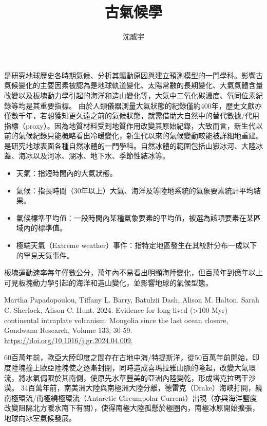\documentclass[a4paper,12pt]{report}
\begin{document}
\title{古氣候學}
\author{沈威宇}
\date{\temtoday}
\titletocdoc
{}
是研究地球歷史各時期氣候、分析其驅動原因與建立預測模型的一門學科。影響古氣候變化的主要因素被認為是地球軌道變化、太陽常數的長期變化、大氣氣體含量改變以及板塊動力學引起的海洋和造山變化等，大氣中二氧化碳濃度、氧同位素紀錄等均是其重要指標。
由於人類儀器測量大氣狀態的紀錄僅約400年，歷史文獻亦僅數千年，若想獲知更久遠之前的氣候狀態，就需借助大自然中的替代數據/代用指標（proxy）。因為地質材料受到地質作用改變其原始紀錄，大致而言，新生代以前的氣候紀錄只能概略看出冷暖變化，新生代以來的氣候變動較能被詳細地重建。
是研究地球表面各種自然冰體的一門學科。自然冰體的範圍包括山嶽冰河、大陸冰蓋、海冰以及河冰、湖冰、地下水、季節性結冰等。
\begin{itemize}
\item 天氣：指短時間內的大氣狀態。
\item 氣候：指長時間（30年以上）大氣、海洋及等陸地系統的氣象要素統計平均結果。
\item 氣候標準平均值：一段時間內某種氣象要素的平均值，被選為該項要素在某區域內的標準值。
\item 極端天氣（Extreme weather）事件：指特定地區發生在其統計分布一成以下的罕見天氣事件。
\end{itemize}
板塊運動速率每年僅數公分，萬年內不易看出明顯海陸變化，但百萬年到億年以上可見板塊動力學引起的海洋和造山變化，並影響地球的氣候型態。
\bct\bfH\ctr{}\caption{Martha Papadopoulou, Tiffany L. Barry, Batulzii Dash, Alison M. Halton, Sarah C. Sherlock, Alison C. Hunt. 2024. Evidence for long-lived (>100 Myr) continental intraplate volcanism: Mongolia since the last ocean closure, Gondwana Research, Volume 133, 30-59. \href{https://doi.org/10.1016/j.gr.2024.04.009}{https://doi.org/10.1016/j.gr.2024.04.009}.}\ef\FB\ect\bct\bfH\ctr{}\ef\FB\ect
{}
60百萬年前，歐亞大陸印度之間存在古地中海/特提斯洋，從50百萬年前開始，印度陸塊撞上歐亞陸塊使之逐漸封閉，同時造成喜瑪拉雅山脈的隆起，改變大氣環流，將水氣侷限於其南側，使原先水草豐美的亞洲內陸變乾，形成塔克拉瑪干沙漠。
34百萬年前，南美洲大陸與南極洲大陸分離，德雷克（Drake）海峽打開，繞南極環流/南極繞極環流（Antarctic Circumpolar Current）出現（亦與海洋鹽度改變阻隔北方暖水南下有關），使得南極大陸孤懸於極圈內，南極冰原開始擴張，地球向冰室氣候發展。
\end{document}
